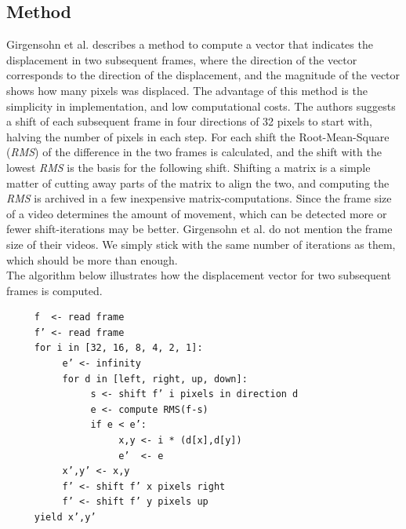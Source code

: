 \subsection{Method}
Girgensohn et al. \cite{Girgensohn:2000:SAH:354401.354415} describes a method to compute a vector that indicates the displacement in two subsequent frames, where the direction of the vector corresponds to the direction of the displacement, and the magnitude of the vector shows how many pixels was displaced. The advantage of this method is the simplicity in implementation, and low computational costs. The authors suggests a shift of each subsequent frame in four directions of 32 pixels to start with, halving the number of pixels in each step. For each shift the Root-Mean-Square (\textit{RMS}) of the difference in the two frames is calculated, and the shift with the lowest \textit{RMS} is the basis for the following shift. Shifting a matrix is a simple matter of cutting away parts of the matrix to align the two, and computing the \textit{RMS} is archived in a few inexpensive matrix-computations. Since the frame size of a video determines the amount of movement, which can be detected more or fewer shift-iterations may be better. Girgensohn et al. \cite{Girgensohn:2000:SAH:354401.354415} do not mention the frame size of their videos. We simply stick with the same number of iterations as them, which should be more than enough.\\
The algorithm below illustrates how the displacement vector for two subsequent frames is computed.
%
\begin{verbatim}
     f  <- read frame
     f’ <- read frame
     for i in [32, 16, 8, 4, 2, 1]:
          e’ <- infinity
          for d in [left, right, up, down]:
               s <- shift f’ i pixels in direction d
               e <- compute RMS(f-s)
               if e < e’:
                    x,y <- i * (d[x],d[y])
                    e’  <- e
          x’,y’ <- x,y
          f’ <- shift f’ x pixels right
          f’ <- shift f’ y pixels up
     yield x’,y’
\end{verbatim}
%
